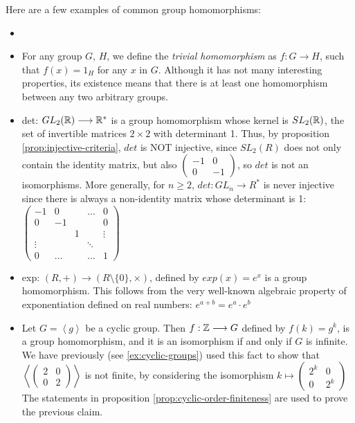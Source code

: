 Here are a few examples of common group homomorphisms: 
\begin{example}
    \begin{itemize}
        \item []
        \item For any group $G$, $H$, we define the \textit{trivial homomorphism} as $f: G \longrightarrow H$, such that $f(x) = 1_H$ for any $x$ in $G$. Although it has not many interesting properties, its existence means that there is at least one homomorphism between any two arbitrary groups. 
        \item det: $GL_2(\mathbb{R}) \longrightarrow \mathbb{R}^*$ is a group homomorphism whose kernel is $SL_2(\mathbb{R})$, the set of invertible matrices $2\times 2$ with determinant 1. Thus, by proposition \ref{prop:injective-criteria}, $det$ is NOT injective, since $SL_2(R)$ does not only contain the identity matrix, but also $\begin{pmatrix} -1 & 0 \\ 0 & -1 \end{pmatrix}$, so $det$ is not an isomorphisms. More generally, for $n \geq 2$, $det: GL_n \longrightarrow R^*$ is never injective since there is always a non-identity matrix whose determinant is 1: $\begin{pmatrix}
            -1 & 0 & & \hdots & 0 \\
            0 & -1 &  &      & 0\\
            & & 1 & &  \vdots \\
            \vdots & & & \ddots & \\
            0 & \hdots & & \hdots & 1   
        \end{pmatrix}$

        \item exp: $(R, +) \longrightarrow (R\setminus\{0\}, \times)$, defined by $exp(x) = e^x$ is a group homomorphism. This follows from the very well-known algebraic property of exponentiation defined on real numbers: $e^{a + b} = e^a\cdot e^b$
        \item Let $G = \left\langle g \right\rangle$ be a cyclic group. Then $f: \mathbb{Z} \longrightarrow G$ defined by $f(k) = g^k$,  is a group homomorphism, and it is an isomorphism if and only if $G$ is infinite. We have previously (see \ref{ex:cyclic-groups}) used this fact to show that $\left\langle \begin{pmatrix}
            2 & 0 \\
            0 & 2
        \end{pmatrix}\right\rangle$ is not finite, by considering the isomorphism $k \longmapsto \begin{pmatrix} 2^k & 0 \\ 0 & 2^k \end{pmatrix}$
        The statements in proposition \ref{prop:cyclic-order-finiteness} are used to prove the previous claim.


\end{itemize}
\end{example}
